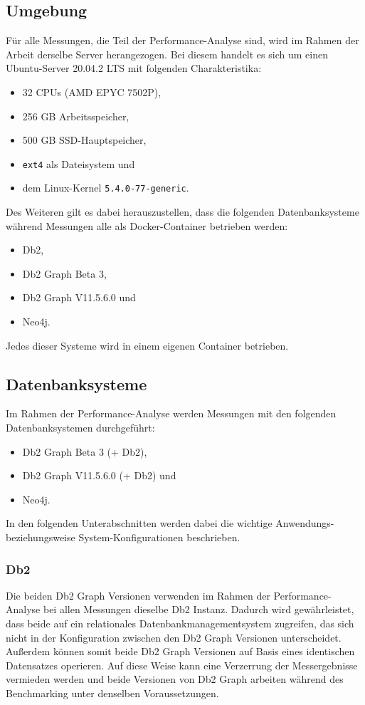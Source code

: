 \subsection{Umgebung}
Für alle Messungen, die Teil der Performance-Analyse sind, wird im Rahmen der Arbeit derselbe Server herangezogen. Bei diesem handelt es sich um einen Ubuntu-Server 20.04.2 LTS mit folgenden Charakteristika:
\begin{itemize}
    \item 32 CPUs (AMD EPYC 7502P), 
    \item 256 GB Arbeitsspeicher,
    \item 500 GB SSD-Hauptspeicher,
    \item \texttt{ext4} als Dateisystem und 
    \item dem Linux-Kernel \texttt{5.4.0-77-generic}.
\end{itemize}
Des Weiteren gilt es dabei herauszustellen, dass die folgenden Datenbanksysteme während Messungen alle als Docker-Container betrieben werden: 
\begin{itemize}
    \item Db2,
    \item Db2 Graph Beta 3,
    \item Db2 Graph V11.5.6.0 und 
    \item Neo4j. 
\end{itemize}
Jedes dieser Systeme wird in einem eigenen Container betrieben. 

\subsection{Datenbanksysteme}
Im Rahmen der Performance-Analyse werden Messungen mit den folgenden Datenbanksystemen durchgeführt: 
\begin{itemize}
    \item Db2 Graph Beta 3 (+ Db2),
    \item Db2 Graph V11.5.6.0 (+ Db2) und
    \item Neo4j.
\end{itemize}
In den folgenden Unterabschnitten werden dabei die wichtige Anwendungs- be\-zieh\-ungs\-wei\-se System-Konfigurationen beschrieben. 

\subsubsection{Db2}
Die beiden Db2 Graph Versionen verwenden im Rahmen der Performance-Analyse bei allen Messungen dieselbe Db2 Instanz. Dadurch wird gewährleistet, dass beide auf ein relationales Datenbankmanagementsystem zugreifen, das sich nicht in der Konfiguration zwischen den Db2 Graph Versionen unterscheidet. Außerdem können somit beide Db2 Graph Versionen auf Basis eines identischen Datensatzes operieren. Auf diese Weise kann eine Verzerrung der Messergebnisse vermieden werden und beide Versionen von Db2 Graph arbeiten während des Benchmarking unter denselben Voraussetzungen.

